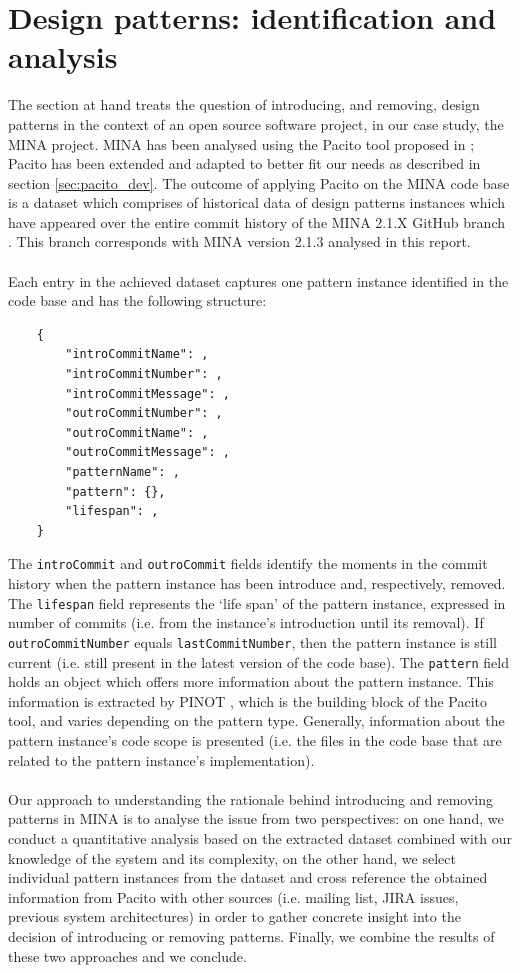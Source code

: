\section{Design patterns: identification and analysis}
The section at hand treats the question of introducing, and removing, design patterns in the context of an open source software project, in our case study, the MINA project. MINA has been analysed using the Pacito tool proposed in \cite{pacito}; Pacito has been extended and adapted to better fit our needs as described in section \ref{sec:pacito_dev}. The outcome of applying Pacito on the MINA code base is a dataset which comprises of historical data of design patterns instances which have appeared over the entire commit history of the MINA 2.1.X GitHub branch \cite{mina-github}. This branch corresponds with MINA version 2.1.3 analysed in this report.\\\\
Each entry in the achieved dataset captures one pattern instance identified in the code base and has the following structure:

\begin{verbatim}
    {
        "introCommitName": ,
        "introCommitNumber": ,
        "introCommitMessage": ,
        "outroCommitNumber": ,
        "outroCommitName": ,
        "outroCommitMessage": ,
        "patternName": ,
        "pattern": {},
        "lifespan": ,
    }
\end{verbatim}
The \texttt{introCommit} and \texttt{outroCommit} fields identify the moments in the commit history when the pattern instance has been introduce and, respectively, removed. The \texttt{lifespan} field represents the `life span' of the pattern instance, expressed in number of commits (i.e. from the instance's introduction until its removal). If \texttt{outroCommitNumber} equals \texttt{lastCommitNumber}, then the pattern instance is still current (i.e. still present in the latest version of the code base). The \texttt{pattern} field holds an object which offers more information about the pattern instance. This information is extracted by PINOT \cite{pinot}, which is the building block of the Pacito tool, and varies depending on the pattern type. Generally, information about the pattern instance's code scope is presented (i.e. the  files in the code base that are related to the pattern instance's implementation).\\\\
Our approach to understanding the rationale behind introducing and removing patterns in MINA is to analyse the issue from two perspectives: on one hand, we conduct a quantitative analysis based on the extracted dataset combined with our knowledge of the system and its complexity, on the other hand, we select individual pattern instances from the dataset and cross reference the obtained information from Pacito with other sources (i.e. mailing list, JIRA issues, previous system architectures) in order to gather concrete insight into the decision of introducing or removing patterns. Finally, we combine the results of these two approaches and we conclude. 

